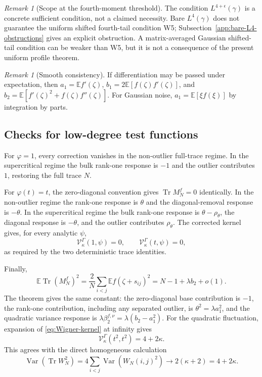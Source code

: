 \documentclass[11pt]{article}
\theoremstyle{definition}
\theoremstyle{remark}
\newtheorem{remark}[theorem]{Remark}
\newcommand{\E}{\mathbb E}
\newcommand{\Var}{\operatorname{Var}}
\newcommand{\Tr}{\operatorname{Tr}}
\begin{document}
\begin{remark}[Scope at the fourth-moment threshold]
The condition $L^{4+\epsilon}(\gamma)$ is a concrete sufficient condition,
not a claimed necessity.  Bare $L^4(\gamma)$ does not guarantee the uniform
shifted fourth-tail condition W5; Subsection~\ref{app:bare-L4-obstructions}
gives an explicit obstruction.  A matrix-averaged Gaussian shifted-tail
condition can be weaker than W5, but it is not a consequence of the present
uniform profile theorem.
\end{remark}

\begin{remark}[Smooth consistency]
If differentiation may be passed under expectation, then
$a_1=\E f'(\zeta)$,
$b_1=2\E[f(\zeta)f'(\zeta)]$, and
$b_2=\E[f'(\zeta)^2+f(\zeta)f''(\zeta)]$.  For Gaussian noise,
$a_1=\E[\xi f(\xi)]$ by integration by parts.
\end{remark}
\subsection{Checks for low-degree test functions}

For $\varphi=1$, every correction vanishes in the non-outlier full-trace
regime.  In the supercritical regime the bulk rank-one response is $-1$ and
the outlier contributes $1$, restoring the full trace $N$.

For $\varphi(t)=t$, the zero-diagonal convention gives
$\Tr M_N^f=0$ identically.  In the non-outlier regime the rank-one response is
$\theta$ and the diagonal-removal response is $-\theta$.  In the
supercritical regime the bulk rank-one response is $\theta-\rho_\theta$, the
diagonal response is $-\theta$, and the outlier contributes $\rho_\theta$.
The corrected kernel gives, for every analytic \(\psi\),
\begin{equation}\label{eq:linear-covariance-check}
 \mathcal V_\kappa^\Gamma(1,\psi)=0,
 \qquad
 \mathcal V_\kappa^\Gamma(t,\psi)=0,
\end{equation}
as required by the two deterministic trace identities.

Finally,
\[
 \E\Tr(M_N^f)^2
 =\frac2N\sum_{i<j}\E f(\zeta+s_{ij})^2
 =N-1+\lambda b_2+o(1).
\]
The theorem gives the same constant: the zero-diagonal base contribution is
$-1$, the rank-one contribution, including any separated outlier, is
$\theta^2=\lambda a_1^2$, and the quadratic variance response is
$\lambda\beta_2^{f,\nu}=\lambda(b_2-a_1^2)$.
For the quadratic fluctuation, expansion of \eqref{eq:Wigner-kernel} at
infinity gives
\begin{equation}\label{eq:quadratic-covariance-check}
 \mathcal V_\kappa^\Gamma(t^2,t^2)=4+2\kappa.
\end{equation}
This agrees with the direct homogeneous calculation
\[
 \Var\!\left(\Tr W_N^2\right)
 =4\sum_{i<j}\Var(W_N(i,j)^2)
 \longrightarrow 2(\kappa+2)=4+2\kappa.
\]
\end{document}
